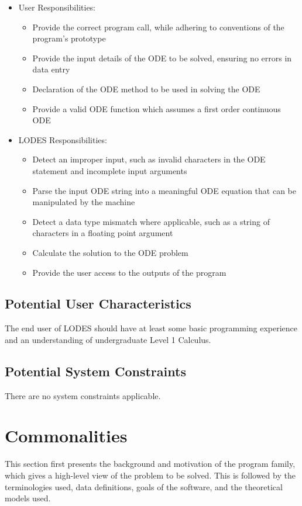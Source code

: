 \documentclass[12pt]{article}
\newcommand{\famname}{LODES} %
\begin{document}
\begin{itemize}
\item User Responsibilities:
\begin{itemize}
\item Provide the correct program call, while adhering to conventions of the program's prototype
\item Provide the input details of the ODE to be solved, ensuring no errors in data entry
\item Declaration of the ODE method to be used in solving the ODE
\item Provide a valid ODE function which assumes a first order continuous ODE
\end{itemize}
\item \famname{} Responsibilities:
\begin{itemize}
\item Detect an improper input, such as invalid characters in the ODE statement and incomplete input arguments
\item Parse the input ODE string into a meaningful ODE equation that can be manipulated by the machine
\item Detect a data type mismatch where applicable, such as a string of characters in a floating point argument
\item Calculate the solution to the ODE problem
\item Provide the user access to the outputs of the program
\end{itemize}
\end{itemize}

\subsection{Potential User Characteristics} \label{SecUserCharacteristics}

The end user of \famname{} should have at least some basic programming experience and
an understanding of undergraduate Level 1 Calculus.

\subsection{Potential System Constraints}

There are no system constraints applicable.

\section{Commonalities}
This section first presents the background and motivation of the program family, which gives a
high-level view of the problem to be solved.  This is followed by the terminologies used, data
definitions, goals of the software, and the theoretical models used. 
\end{document}
